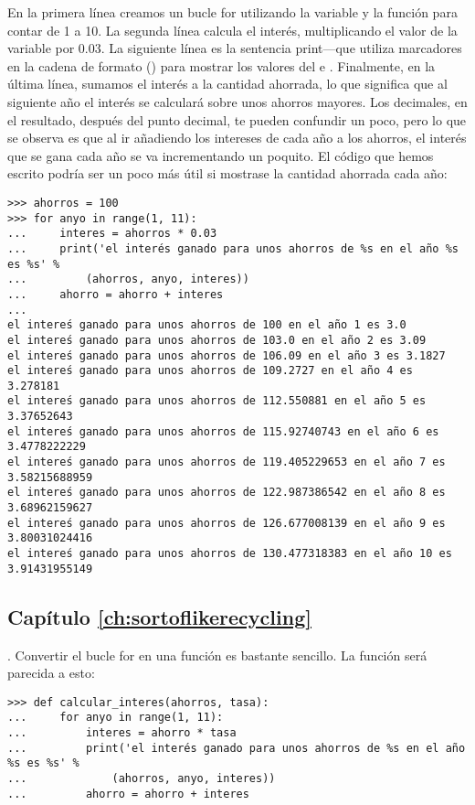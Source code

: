 En la primera línea creamos un bucle for utilizando la variable  y la función  para contar de 1 a 10.   La segunda línea calcula el interés, multiplicando el valor de la variable  por 0.03.  La siguiente línea es la sentencia print---que utiliza marcadores en la cadena de formato () para mostrar los valores del  e .  Finalmente, en la última línea, sumamos el interés a la cantidad ahorrada, lo que significa que al siguiente año el interés se calculará sobre unos ahorros mayores.
Los decimales, en el resultado, después del punto decimal, te pueden confundir un poco, pero lo que se observa es que al ir añadiendo los intereses de cada año a los ahorros, el interés que se gana cada año se va incrementando un poquito.
El código que hemos escrito podría ser un poco más útil si mostrase la cantidad ahorrada cada año:

\begin{listing}
\begin{verbatim}
>>> ahorros = 100
>>> for anyo in range(1, 11):
...     interes = ahorros * 0.03
...     print('el interés ganado para unos ahorros de %s en el año %s es %s' % 
...         (ahorros, anyo, interes))
...     ahorro = ahorro + interes
... 
el intereś ganado para unos ahorros de 100 en el año 1 es 3.0
el intereś ganado para unos ahorros de 103.0 en el año 2 es 3.09
el intereś ganado para unos ahorros de 106.09 en el año 3 es 3.1827
el intereś ganado para unos ahorros de 109.2727 en el año 4 es 3.278181
el intereś ganado para unos ahorros de 112.550881 en el año 5 es 3.37652643
el intereś ganado para unos ahorros de 115.92740743 en el año 6 es 3.4778222229
el intereś ganado para unos ahorros de 119.405229653 en el año 7 es 3.58215688959
el intereś ganado para unos ahorros de 122.987386542 en el año 8 es 3.68962159627
el intereś ganado para unos ahorros de 126.677008139 en el año 9 es 3.80031024416
el intereś ganado para unos ahorros de 130.477318383 en el año 10 es 3.91431955149
\end{verbatim}
\end{listing}

\subsection*{Capítulo \ref{ch:sortoflikerecycling}}

. Convertir el bucle for en una función es bastante sencillo.   La función será parecida a esto:

\begin{listing}
\begin{verbatim}
>>> def calcular_interes(ahorros, tasa):
...     for anyo in range(1, 11):
...         interes = ahorro * tasa
...         print('el interés ganado para unos ahorros de %s en el año %s es %s' % 
...             (ahorros, anyo, interes))
...         ahorro = ahorro + interes
\end{verbatim}
\end{listing}

